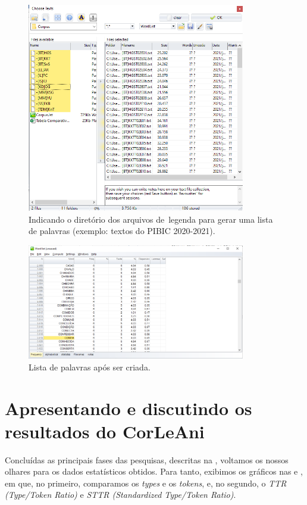 \documentclass[portuguese]{textolivre}
\begin{document}
\begin{figure}[htbp]
 \centering
 \includegraphics[width=0.85\textwidth]{Fig32.png}
 \caption{Indicando o diretório dos arquivos de legenda  para gerar uma lista de palavras (exemplo: textos do PIBIC 2020-2021).}
 \label{fig32}
\end{figure}

\begin{figure}[htbp]
 \centering
 \includegraphics[width=0.85\textwidth]{Fig33.png}
 \caption{Lista de palavras após ser criada.}
 \label{fig33}
\end{figure}

\section{Apresentando e discutindo os resultados do CorLeAni}\label{sec-resumo}
Concluídas as principais fases das pesquisas, descritas na , voltamos os nossos olhares para os dados estatísticos obtidos. Para tanto, exibimos os gráficos nas  e , em que, no primeiro, comparamos os \textit{types} e os \textit{tokens}, e, no segundo, o \textit{TTR (Type/Token Ratio)} e \textit{STTR (Standardized Type/Token Ratio)}.
\end{document}

